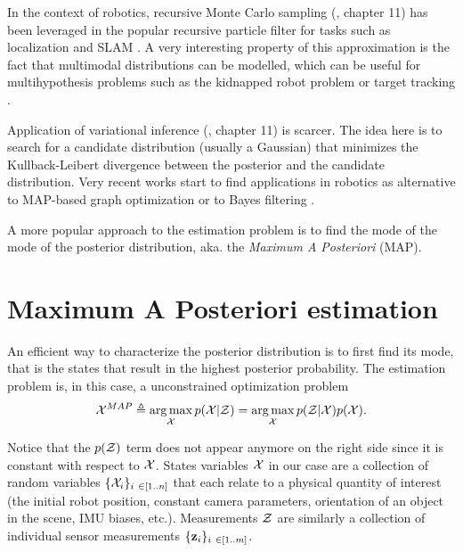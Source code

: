 In the context of robotics, recursive Monte Carlo sampling (\cite{koller2009probabilistic}, chapter 11) has been 
leveraged in the popular recursive particle filter for tasks such as localization \cite{dellaert1999monte} and SLAM \cite{montemerlo2002fastslam}. A very interesting
property of this approximation is the fact that multimodal distributions can be modelled, which can be useful
for multihypothesis problems such as the kidnapped robot problem \cite{dellaert1999monte} or target tracking \cite{gustafsson2002particle}. 

Application of variational inference (\cite{koller2009probabilistic}, chapter 11) is scarcer. The idea here is to search for a candidate distribution 
(usually a Gaussian) that minimizes the Kullback-Leibert divergence between the posterior and the candidate distribution. Very recent works start 
to find applications in robotics as alternative to MAP-based graph optimization \cite{barfoot2020exactly, wong2020variational} 
or to Bayes filtering \cite{lambert2022recursive}. 

A more popular approach to the estimation problem is to find the mode of the mode of the posterior distribution, aka. the \textit{Maximum A Posteriori} (MAP).



\section{Maximum A Posteriori estimation}

An efficient way to characterize the posterior distribution is to first find its mode, that is the states that 
result in the highest posterior probability. The estimation problem is, in this case, a unconstrained optimization problem
%
\begin{equation}
    \label{eq:MAP_pbe}
    \mathcal{X}^{MAP} \triangleq \operatorname*{arg\,max}_{\mathcal{X}} p(\mathcal{X} | \mathcal{Z}) = \operatorname*{arg\,max}_{\mathcal{X}} p(\mathcal{Z} | \mathcal{X}) p(\mathcal{X}).
\end{equation}
%

Notice that the $p(\mathcal{Z})$ term does not appear anymore on the right side since it is constant with respect to $\mathcal{X}$.
States variables $\mathcal{X}$ in our case are a collection of random variables $\{\cX_i\}_{i \in [1..n]}$ that each relate to a physical quantity of 
interest (\eg the initial robot position, constant camera parameters, orientation of an object in the scene, IMU biases, etc.). Measurements $\mathcal{Z}$ are 
similarly a collection of individual sensor measurements $\{\bfz_i\}_{i \in [1..m]}$.

